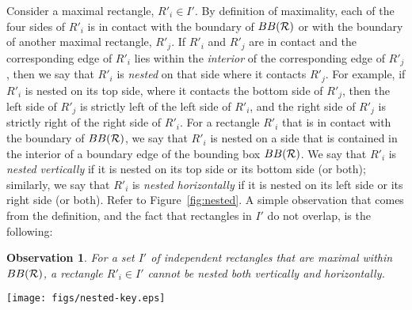 \documentclass{article}
\newcommand{\B}{BB({\cal R})}
\newtheorem{observation}{Observation}
\begin{document}
\medskip
{}\quad
Consider a maximal rectangle, $R'_i\in I'$. By definition of
maximality, each of the four sides of $R'_i$ is in contact with the
boundary of $\B$ or with the boundary of another maximal rectangle,
$R'_j$. If $R'_i$ and $R'_j$ are in contact and the corresponding edge
of $R'_i$ lies within the {\em interior} of the corresponding edge of
$R'_j$, then we say that $R'_i$ is {\em nested} on that side where it
contacts $R'_j$. For example, if $R'_i$ is nested on its top side,
where it contacts the bottom side of $R'_j$, then the left side of
$R'_j$ is strictly left of the left side of $R'_i$, and the right side
of $R'_j$ is strictly right of the right side of $R'_i$.
%
For a rectangle $R'_i$ that is in contact with the boundary of $\B$,
we say that $R'_i$ is nested on a side that is contained in the
interior of a boundary edge of the bounding box $\B$.
%
We say that $R'_i$ is {\em nested vertically} if it is nested on its
top side or its bottom side (or both); similarly, we say that $R'_i$ is {\em
  nested horizontally} if it is nested on its left side or its right
side (or both).  Refer to Figure~\ref{fig:nested}. A simple observation that
comes from the definition, and the fact that rectangles in $I'$ do not
overlap, is the following:

%

\begin{observation}
  \label{obs:key}
For a set $I'$ of independent rectangles that are maximal within $\B$,
a rectangle $R'_i\in I'$ cannot be nested both vertically and horizontally.
\end{observation}

\begin{figure*}[!ht]
	\centering
	\texttt{[image: figs/nested-key.eps]}
	\caption{Proof of Observation~\ref{obs:key}: If $R'_i$ is
          nested vertically, with its top side being contained in the
          interior of the bottom side of $R'_j$, then the red points,
          which are slightly shifted top corners of $R'_i$, must be
          interior to $R'_j$. If $R'_i$ were also nested horizontally,
          abutting one of the dashed rectangles (of $I'$) to the
          left/right of $R'_i$, then we get a contradiction to the
          interior disjointness of rectangles, as a red point would be
          interior to two rectangles of $I'$.}
	\label{fig:key}
\end{figure*}
\end{document}
